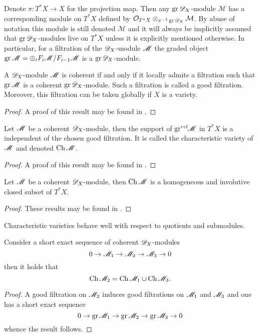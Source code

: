 Denote $\pi:T^*X \to X$ for the projection map.
Then any $\operatorname{gr}\mathscr{D}_X$-module $\mathcal{M}$ has a corresponding module on $T^* X$ defined by $\mathcal{O}_{T^*X} \otimes_{\pi^{-1}\operatorname{gr} \mathscr{D}_X} \mathcal{M}$.
By abuse of notation this module is still denoted $\mathcal{M}$ and it will always be implicitly assumed that $\operatorname{gr} \mathscr{D}_X$-modules live on $T^*X$ unless it is explicitly mentioned otherwise.
In particular, for a filtration of the $\mathscr{D}_X$-module $\mathscr{M}$ the graded object $\operatorname{gr} \mathscr{M} = \oplus_i F_i \mathscr{M} / F_{i-1}\mathscr{M}$ is a $\operatorname{gr} \mathscr{D}_X$-module.

\begin{proposition}\label{prop: GoodFiltration}
  A $\mathscr{D}_X$-module $\mathscr{M}$ is coherent if and only if it locally admits a filtration such that $\operatorname{gr} \mathscr{M}$ is a coherent $\operatorname{gr} \mathscr{D}_X$-module. Such a filtration is called a good filtration. Moreover, this filtration can be taken globally if $X$ is a variety.
\end{proposition}
\begin{proof}
  A proof of this result may be found in \cite[Chapter 2]{hotta2007d}.
\end{proof}
\begin{proposition}
  Let $\mathscr{M}$ be a coherent $\mathscr{D}_X$-module, then the support of $\operatorname{gr}^{rel}\mkern-5mu\mathscr{M}$ in $T^* X$ is a independent of the chosen good filtration. It is called the characteristic variety of $\mathscr{M}$ and denoted $\operatorname{Ch} \mathscr{M}$.
\end{proposition}
\begin{proof}
  A proof of this result may be found in \cite[Chapter 2]{hotta2007d}.
\end{proof}
\begin{proposition}\label{prop: StructureChVar}
  Let $\mathscr{M}$ be a coherent $\mathscr{D}_X$-module, then $\operatorname{Ch} \mathscr{M}$ is a homogeneous and involutive closed subset of $T^* X$.
\end{proposition}
\begin{proof}
  These results may be found in \cite[Chapter 2]{kashiwara2003d}.
\end{proof}
Characteristic varieties behave well with respect to quotients and submodules.
\begin{proposition}\label{prop: SESBehaviourChar}
  Consider a short exact sequence of coherent $\mathscr{D}_X$-modules
  $$0 \to \mathscr{M}_1 \to \mathscr{M}_2 \to \mathscr{M}_3 \to 0 $$
  then it holds that
  $$\operatorname{Ch} \mathscr{M}_2 = \operatorname{Ch} \mathscr{M}_1 \cup \operatorname{Ch} \mathscr{M}_3. $$
\end{proposition}
\begin{proof}
  A good filtration on $\mathscr{M}_2$ induces good filtrations on $\mathscr{M}_1$ and $\mathscr{M}_3$ and one has a short exact sequence
  $$0\to \operatorname{gr} \mathscr{M}_1 \to \operatorname{gr} \mathscr{M}_2 \to \operatorname{gr} \mathscr{M}_3 \to 0 $$
  whence the result follows.
\end{proof}
